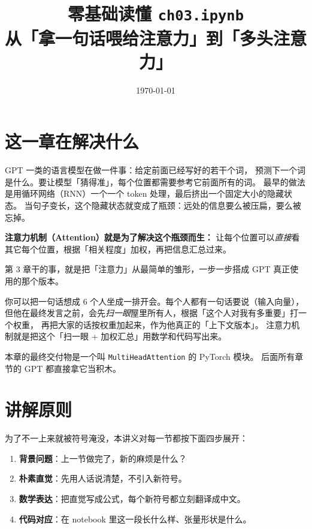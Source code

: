 \documentclass[11pt,a4paper]{ctexart}
\title{零基础读懂 \texttt{ch03.ipynb}\\\large 从「拿一句话喂给注意力」到「多头注意力」}
\author{}
\date{\today}
\begin{document}
\maketitle
\tableofcontents
\newpage

\section{这一章在解决什么}

\begin{problemblock}
GPT 一类的语言模型在做一件事：给定前面已经写好的若干个词，
预测下一个词是什么。要让模型「猜得准」，每个位置都需要参考它前面所有的词。
最早的做法是用循环网络（RNN）一个一个 token 处理，最后挤出一个固定大小的隐藏状态。
当句子变长，这个隐藏状态就变成了瓶颈：远处的信息要么被压扁，要么被忘掉。

\textbf{注意力机制（Attention）就是为了解决这个瓶颈而生：}
让每个位置可以\emph{直接}看其它每个位置，根据「相关程度」加权，再把信息汇总过来。

第 3 章干的事，就是把「注意力」从最简单的雏形，一步一步搭成 GPT 真正使用的那个版本。
\end{problemblock}

\begin{intuitionblock}
你可以把一句话想成 6 个人坐成一排开会。每个人都有一句话要说（输入向量），
但他在最终发言之前，会先\emph{扫一眼}屋里所有人，根据「这个人对我有多重要」打一个权重，
再把大家的话按权重加起来，作为他真正的「上下文版本」。
注意力机制就是把这个「扫一眼 + 加权汇总」用数学和代码写出来。
\end{intuitionblock}

\begin{keypointblock}
本章的最终交付物是一个叫 \texttt{MultiHeadAttention} 的 PyTorch 模块。
后面所有章节的 GPT 都直接拿它当积木。
\end{keypointblock}

\section{讲解原则}

为了不一上来就被符号淹没，本讲义对每一节都按下面四步展开：

\begin{enumerate}[label=\textbf{\arabic*.}]
  \item \textbf{背景问题}：上一节做完了，新的麻烦是什么？
  \item \textbf{朴素直觉}：先用人话说清楚，不引入新符号。
  \item \textbf{数学表达}：把直觉写成公式，每个新符号都立刻翻译成中文。
  \item \textbf{代码对应}：在 notebook 里这一段长什么样、张量形状是什么。
\end{enumerate}
\end{document}
